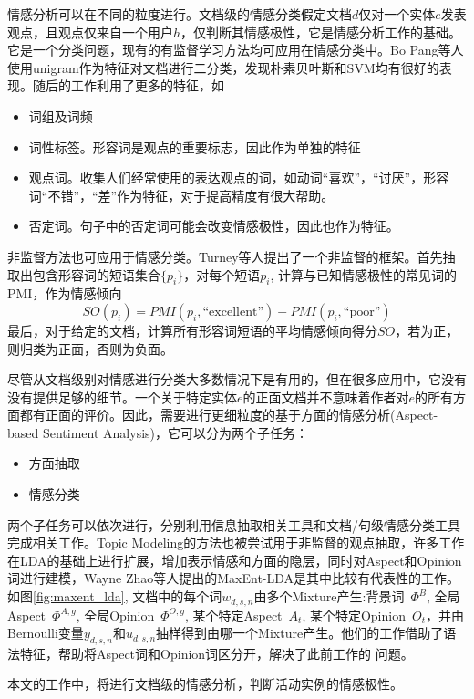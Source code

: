 情感分析可以在不同的粒度进行。文档级的情感分类假定文档$d$仅对一个实体$e$发表观点，且观点仅来自一个用户$h$，仅判断其情感极性，它是情感分析工作的基础。
它是一个分类问题，现有的有监督学习方法均可应用在情感分类中。Bo Pang等人\cite{pang2002thumbs}使用unigram作为特征对文档进行二分类，发现朴素贝叶斯和SVM均有很好的表现。随后的工作\cite{pang2008opinion}利用了更多的特征，如
\begin{itemize}
\item 词组及词频
\item 词性标签。形容词是观点的重要标志，因此作为单独的特征
\item 观点词。收集人们经常使用的表达观点的词，如动词``喜欢''，``讨厌''，形容词``不错''，``差''作为特征，对于提高精度有很大帮助。
\item 否定词。句子中的否定词可能会改变情感极性，因此也作为特征。
\end{itemize}

非监督方法也可应用于情感分类。Turney等人\cite{turney2002thumbs}提出了一个非监督的框架。首先抽取出包含形容词的短语集合$\{p_i\}$，对每个短语$p_i$, 计算与已知情感极性的常见词的PMI，作为情感倾向
\[
SO(p_i) = PMI(p_i, \text{``excellent''}) - PMI(p_i, \text{``poor''})
\]
最后，对于给定的文档，计算所有形容词短语的平均情感倾向得分$SO$，若为正，则归类为正面，否则为负面。

尽管从文档级别对情感进行分类大多数情况下是有用的，但在很多应用中，它没有没有提供足够的细节。一个关于特定实体$e$的正面文档并不意味着作者对$e$的所有方面都有正面的评价。因此，需要进行更细粒度的基于方面的情感分析(Aspect-based Sentiment Analysis)，它可以分为两个子任务：
\begin{itemize}
\item 方面抽取
\item 情感分类
\end{itemize}
两个子任务可以依次进行，分别利用信息抽取相关工具和文档/句级情感分类工具完成相关工作。Topic Modeling的方法也被尝试用于非监督的观点抽取，许多工作在LDA的基础上进行扩展，增加表示情感和方面的隐层，同时对Aspect和Opinion词进行建模，Wayne Zhao等人提出的MaxEnt-LDA是其中比较有代表性的工作\cite{zhao2010jointly}。如图\ref{fig:maxent_lda}, 文档中的每个词$w_{d,s,n}$由多个Mixture产生:背景词\ $\Phi^B$, 全局Aspect\ $\Phi^{A,g}$, 全局Opinion\ $\Phi^{O,g}$, 某个特定Aspect\ $A_t$, 某个特定Opinion\ $O_t$，并由Bernoulli变量$y_{d,s,n}$和$u_{d,s,n}$抽样得到由哪一个Mixture产生。他们的工作借助了语法特征，帮助将Aspect词和Opinion词区分开，解决了此前工作的	问题\cite{titov2008modeling}。

本文的工作中，将进行文档级的情感分析，判断活动实例的情感极性。

